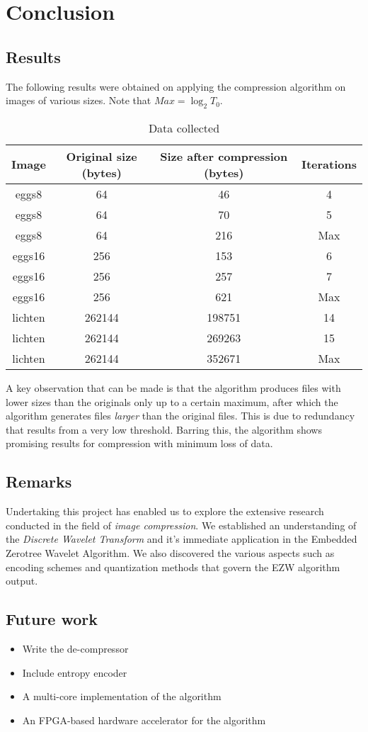 \documentclass[./A14_Report.tex]{subfiles}
\begin{document}
\chapter{Conclusion}
\section{Results}
The following results were obtained on applying the compression algorithm on
images of various sizes. Note that $Max = \log_2{T_0}$.
\begin{table}[H]
\centering
\begin{tabular}{|c|c|c|c|}
    \hline
    \textbf{Image} & \textbf{Original size (bytes)} & \textbf{Size after
    compression (bytes)} & \textbf{Iterations}\\
    \hline
    eggs8 & 64 & 46 & 4\\
    eggs8 & 64 & 70 & 5\\
    eggs8 & 64 & 216 & Max\\
    \hline
    eggs16 & 256 & 153 & 6\\
    eggs16 & 256 & 257 & 7\\
    eggs16 & 256 & 621 & Max\\
    \hline
    lichten & 262144 & 198751 & 14\\
    lichten & 262144 & 269263 & 15\\
    lichten & 262144 & 352671 & Max\\
    \hline
\end{tabular}
\caption{Data collected}
\label{tab:data}
\end{table}

A key observation that can be made is that the algorithm produces files with
lower sizes than the originals only up to a certain maximum, after which the
algorithm generates files \textit{larger} than the original files. This is due
to redundancy that results from a very low threshold. Barring this, the
algorithm shows promising results for compression with minimum loss of data.

\section{Remarks}
Undertaking this project has enabled us to explore the extensive research
conducted in the field of \textit{image compression}. We established an
understanding of the \textit{Discrete Wavelet Transform} and it's
immediate application in the Embedded Zerotree Wavelet Algorithm. We also
discovered the various aspects such as encoding schemes and quantization
methods that govern the EZW algorithm output.

\section{Future work}
\begin{itemize}
        \item Write the de-compressor
        \item Include entropy encoder
        \item A multi-core implementation of the algorithm
        \item An FPGA-based hardware accelerator for the algorithm
\end{itemize}
\end{document}
